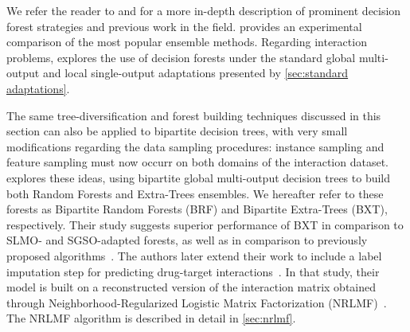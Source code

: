 We refer the reader to  and  for a more in-depth description of prominent decision forest strategies and previous work in the field.  provides an experimental comparison of the most popular ensemble methods.  %
%
Regarding interaction problems,  explores the use of decision forests under the standard global multi-output and local single-output adaptations presented by \autoref{sec:standard adaptations}.

The same tree-diversification and forest building techniques discussed in this section can also be applied to bipartite decision trees, with very small modifications regarding the data sampling procedures: instance sampling and feature sampling must now occurr on both domains of the interaction dataset.
%
 explores these ideas, using bipartite global multi-output decision trees to build both Random Forests and Extra-Trees ensembles. We hereafter refer to these forests as Bipartite Random Forests (BRF) and Bipartite Extra-Trees (BXT), respectively. Their study suggests superior performance of BXT in comparison to SLMO- and SGSO-adapted forests, as well as in comparison to previously proposed algorithms~\cite{pliakos2019network}. %
%
The authors later extend their work to include a label imputation step for predicting drug-target interactions~\cite{pliakos2020drugtarget}. In that study, their model is built on a reconstructed version of the interaction matrix obtained through Neighborhood-Regularized Logistic Matrix Factorization (NRLMF)~\cite{liu2016neighborhood}. The NRLMF algorithm is described in detail in \autoref{sec:nrlmf}.


